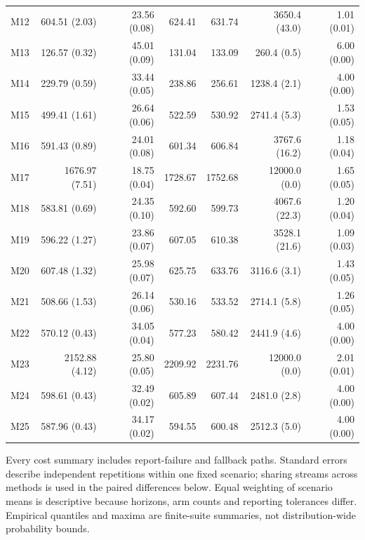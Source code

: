 \documentclass[11pt]{article}
\theoremstyle{remark}
\begin{document}
\begin{longtable}{lrrrrrr}
M12 & 604.51 (2.03) & 23.56 (0.08) & 624.41 & 631.74 & 3650.4 (43.0) & 1.01 (0.01) \\
M13 & 126.57 (0.32) & 45.01 (0.09) & 131.04 & 133.09 & 260.4 (0.5) & 6.00 (0.00) \\
M14 & 229.79 (0.59) & 33.44 (0.05) & 238.86 & 256.61 & 1238.4 (2.1) & 4.00 (0.00) \\
M15 & 499.41 (1.61) & 26.64 (0.06) & 522.59 & 530.92 & 2741.4 (5.3) & 1.53 (0.05) \\
M16 & 591.43 (0.89) & 24.01 (0.08) & 601.34 & 606.84 & 3767.6 (16.2) & 1.18 (0.04) \\
M17 & 1676.97 (7.51) & 18.75 (0.04) & 1728.67 & 1752.68 & 12000.0 (0.0) & 1.65 (0.05) \\
M18 & 583.81 (0.69) & 24.35 (0.10) & 592.60 & 599.73 & 4067.6 (22.3) & 1.20 (0.04) \\
M19 & 596.22 (1.27) & 23.86 (0.07) & 607.05 & 610.38 & 3528.1 (21.6) & 1.09 (0.03) \\
M20 & 607.48 (1.32) & 25.98 (0.07) & 625.75 & 633.76 & 3116.6 (3.1) & 1.43 (0.05) \\
M21 & 508.66 (1.53) & 26.14 (0.06) & 530.16 & 533.52 & 2714.1 (5.8) & 1.26 (0.05) \\
M22 & 570.12 (0.43) & 34.05 (0.04) & 577.23 & 580.42 & 2441.9 (4.6) & 4.00 (0.00) \\
M23 & 2152.88 (4.12) & 25.80 (0.05) & 2209.92 & 2231.76 & 12000.0 (0.0) & 2.01 (0.01) \\
M24 & 598.61 (0.43) & 32.49 (0.02) & 605.89 & 607.44 & 2481.0 (2.8) & 4.00 (0.00) \\
M25 & 587.96 (0.43) & 34.17 (0.02) & 594.55 & 600.48 & 2512.3 (5.0) & 4.00 (0.00) \\
\end{longtable}
\endgroup

Every cost summary includes report-failure and fallback paths. Standard errors describe independent repetitions within one fixed scenario; sharing streams across methods is used in the paired differences below. Equal weighting of scenario means is descriptive because horizons, arm counts and reporting tolerances differ. Empirical quantiles and maxima are finite-suite summaries, not distribution-wide probability bounds.
\end{document}
